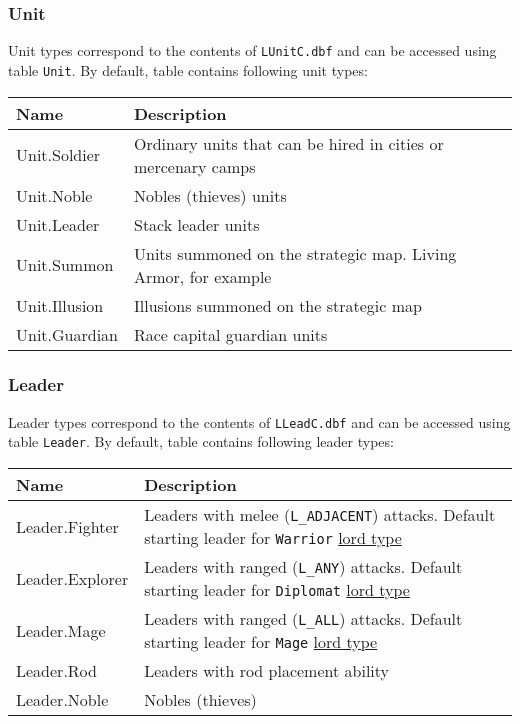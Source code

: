 \subsubsection{Unit}
\label{UnitCategory}
Unit types correspond to the contents of \texttt{LUnitC.dbf} and can be accessed using table \texttt{Unit}.
By default, table contains following unit types:\\
\begin{tabularx}{\linewidth}{| l | X |}
\hline
\textbf{Name} & \textbf{Description} \\
\hline
Unit.Soldier & Ordinary units that can be hired in cities or mercenary camps\\
\hline
Unit.Noble & Nobles (thieves) units\\
\hline
Unit.Leader & Stack leader units\\
\hline
Unit.Summon & Units summoned on the strategic map. Living Armor, for example\\
\hline
Unit.Illusion & Illusions summoned on the strategic map\\
\hline
Unit.Guardian & Race capital guardian units\\
\hline
\end{tabularx}

\subsubsection{Leader}
\label{LeaderCategory}
Leader types correspond to the contents of \texttt{LLeadC.dbf} and can be accessed using table \texttt{Leader}.
By default, table contains following leader types:\\
\begin{tabularx}{\linewidth}{| l | X |}
\hline
\textbf{Name} & \textbf{Description} \\
\hline
Leader.Fighter & Leaders with melee (\texttt{L\_ADJACENT}) attacks. Default starting leader for \texttt{Warrior} \hyperref[LordCategory]{lord type}\\
\hline
Leader.Explorer & Leaders with ranged (\texttt{L\_ANY}) attacks. Default starting leader for \texttt{Diplomat} \hyperref[LordCategory]{lord type}\\
\hline
Leader.Mage & Leaders with ranged (\texttt{L\_ALL}) attacks. Default starting leader for \texttt{Mage} \hyperref[LordCategory]{lord type}\\
\hline
Leader.Rod & Leaders with rod placement ability\\
\hline
Leader.Noble & Nobles (thieves)\\
\hline
\end{tabularx}

